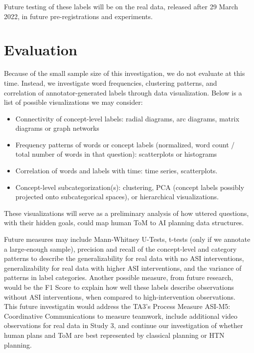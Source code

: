 Future testing of these labels will be on the real data, released after 29 March 2022, in future pre-registrations and experiments. 






\section{Evaluation}

Because of the small sample size of this investigation, we do not evaluate at
this time. Instead, we investigate word frequencies, clustering patterns, and
correlation of annotator-generated labels through data visualization. Below is
a list of possible visualizations we may consider:

\begin{itemize}
    \item Connectivity of concept-level labels: radial diagrams, arc diagrams, matrix diagrams or graph networks
    \item Frequency patterns of words or concept labels (normalized, word count / total number of words in that question): scatterplots or histograms
    \item Correlation of words and labels with time: time series, scatterplots. 
    \item Concept-level subcategorization(s): clustering, PCA (concept labels possibly projected onto subcategorical spaces), or hierarchical visualizations.
\end{itemize}


These visualizations will serve as a preliminary analysis of how uttered questions, with their hidden goals, could map  human ToM to AI planning data structures.

Future measures may include Mann-Whitney U-Tests, t-tests (only if we annotate a large-enough sample), precision and recall of the
concept-level and category patterns to describe the generalizability for real data with no ASI interventions, generalizability for
real data with higher ASI interventions, and the variance of patterns in label categories. Another possible measure, from future research, would be the F1 Score to explain how
well these labels describe observations without ASI interventions, when compared to
high-intervention observations. This future investigatin would address the TA3’s Process Measure ASI-M5: Coordinative Communications   to measure teamwork, include additional video observations for real data in Study 3, and continue our investigation of whether human plans and ToM are best represented by classical planning or HTN planning.


